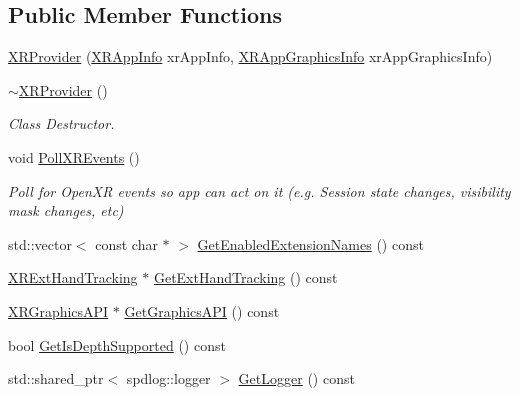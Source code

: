 \subsection*{Public Member Functions}
\begin{DoxyCompactItemize}
\item 
\mbox{\hyperlink{class_open_x_r_provider_1_1_x_r_provider_ae4e2c14022b9db81c0c4090151976bcf}{X\+R\+Provider}} (\mbox{\hyperlink{struct_open_x_r_provider_1_1_x_r_app_info}{X\+R\+App\+Info}} xr\+App\+Info, \mbox{\hyperlink{struct_open_x_r_provider_1_1_x_r_app_graphics_info}{X\+R\+App\+Graphics\+Info}} xr\+App\+Graphics\+Info)
\item 
\mbox{\hyperlink{class_open_x_r_provider_1_1_x_r_provider_a7bce537abed2b4a5ebb7c34f61ccaae8}{$\sim$\+X\+R\+Provider}} ()
\begin{DoxyCompactList}\small\item\em Class Destructor. \end{DoxyCompactList}\item 
void \mbox{\hyperlink{class_open_x_r_provider_1_1_x_r_provider_a1eb2fce148d5ab2d3399235c23131808}{Poll\+X\+R\+Events}} ()
\begin{DoxyCompactList}\small\item\em Poll for Open\+XR events so app can act on it (e.\+g. Session state changes, visibility mask changes, etc) \end{DoxyCompactList}\item 
std\+::vector$<$ const char $\ast$ $>$ \mbox{\hyperlink{class_open_x_r_provider_1_1_x_r_provider_a036e87ad498dc8e9b556dbba3499bf9a}{Get\+Enabled\+Extension\+Names}} () const
\item 
\mbox{\hyperlink{class_open_x_r_provider_1_1_x_r_ext_hand_tracking}{X\+R\+Ext\+Hand\+Tracking}} $\ast$ \mbox{\hyperlink{class_open_x_r_provider_1_1_x_r_provider_a3ed1b75d970694318105a44699768457}{Get\+Ext\+Hand\+Tracking}} () const
\item 
\mbox{\hyperlink{class_open_x_r_provider_1_1_x_r_graphics_a_p_i}{X\+R\+Graphics\+A\+PI}} $\ast$ \mbox{\hyperlink{class_open_x_r_provider_1_1_x_r_provider_aa88f602edaeecefe0d3c1e5072a5f4fc}{Get\+Graphics\+A\+PI}} () const
\item 
bool \mbox{\hyperlink{class_open_x_r_provider_1_1_x_r_provider_a20c6d026a126738127ed300039ff72e1}{Get\+Is\+Depth\+Supported}} () const
\item 
std\+::shared\+\_\+ptr$<$ spdlog\+::logger $>$ \mbox{\hyperlink{class_open_x_r_provider_1_1_x_r_provider_a985813ed6da86367d311836533466f7b}{Get\+Logger}} () const

\end{DoxyCompactItemize}
